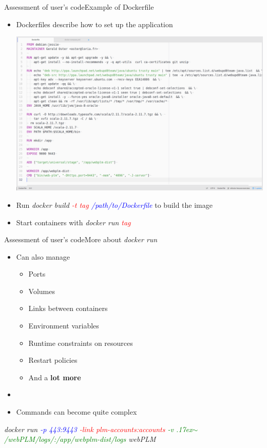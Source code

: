 \documentclass{beamer}
\begin{document}
\begin{frame}{Assessment of user's code}{Example of Dockerfile}
  \begin{itemize}
  \item {
    Dockerfiles describe how to set up the application
  }
  \begin{center}
    \includegraphics[scale=0.12]{img/dockerfile-white.png}
  \end{center}
  \item {
    Run \emph{docker build \textcolor{red}{-t tag} \textcolor{blue}{/path/to/Dockerfile}} to build  the image
  }
  \item {
    Start containers with \emph{docker run \textcolor{red}{tag}}
  }
  \end{itemize}
\end{frame}

\begin{frame}{Assessment of user's code}{More about \emph{docker run}}
  \begin{itemize}
  \item {
    Can also manage
    \begin{itemize}
    \item {
      Ports
      \pause
    }
    \item {
      Volumes
      \pause
    }
    \item {
      Links between containers
      \pause
    }
    \item {
      Environment variables
    }
    \item {
      Runtime constraints on resources
    }
    \item {
      Restart policies
    }
    \item {
      And a \textbf{lot more}
      \pause
    }
    \end{itemize}
  }
  \item[~]
  \item {
    Commands can become quite complex
  }
  \end{itemize}
  \begin{center} {
    \emph{docker run \textcolor{blue}{-p 443:9443} \textcolor{red}{-link plm-accounts:accounts} \textcolor{green}{-v \raise.17ex\hbox{$\scriptstyle\sim$}/webPLM/logs/:/app/webplm-dist/logs} webPLM}
  }
  \end{center}
\end{frame}
\end{document}
